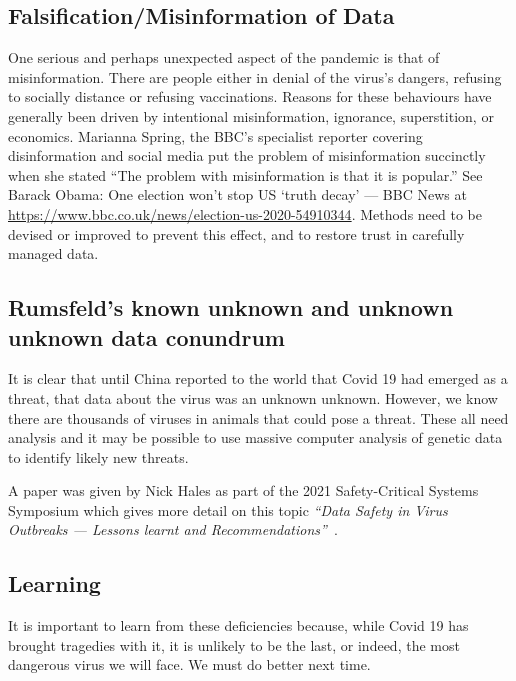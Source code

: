 \subsection{Falsification/Misinformation of Data}
One serious and perhaps unexpected aspect of the pandemic is that of misinformation. There are people either in denial of the virus’s dangers, refusing to socially distance or refusing vaccinations. Reasons for these behaviours have generally been driven by intentional misinformation, ignorance, superstition, or economics. Marianna Spring, the BBC’s specialist reporter covering disinformation and social media put the problem of misinformation succinctly when she stated “The problem with misinformation is that it is popular.” See Barack Obama: One election won't stop US `truth decay' --- BBC News at \href{https://www.bbc.co.uk/news/election-us-2020-54910344}{https://www.bbc.co.uk/news/election-us-2020-54910344}. Methods need to be devised or improved to prevent this effect, and to restore trust in carefully managed data. 

\subsection{Rumsfeld’s known unknown and unknown unknown data conundrum}

It is clear that until China reported to the world that Covid 19 had emerged as a threat, that data about the virus was an unknown unknown. However, we know there are thousands of viruses in animals that could pose a threat. These all need analysis and it may be possible to use massive computer analysis of genetic data to identify likely new threats. 
	
A paper was
given by Nick Hales as part of the 2021 Safety-Critical Systems Symposium which gives more detail on this topic {\it“Data Safety in Virus Outbreaks --- Lessons learnt and Recommendations”}~\cite{citation:SCSC161}.

\subsection{Learning}

It is important to learn from these deficiencies because, while Covid 19 has brought tragedies with it, it is unlikely to be the last, or indeed, the most dangerous virus we will face. We must do better next time.

